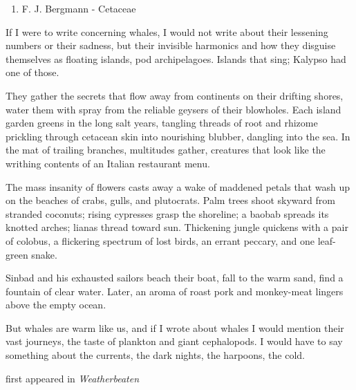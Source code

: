 \begin{enumerate}
\def\labelenumi{\arabic{enumi}.}
\tightlist
\item
  F. J. Bergmann - Cetaceae
\end{enumerate}

If I were to write concerning whales, I would not write about their
lessening numbers or their sadness, but their invisible harmonics and
how they disguise themselves as floating islands, pod archipelagoes.
Islands that sing; Kalypso had one of those.

They gather the secrets that flow away from continents on their drifting
shores, water them with spray from the reliable geysers of their
blowholes. Each island garden greens in the long salt years, tangling
threads of root and rhizome prickling through cetacean skin into
nourishing blubber, dangling into the sea. In the mat of trailing
branches, multitudes gather, creatures that look like the writhing
contents of an Italian restaurant menu.

The mass insanity of flowers casts away a wake of maddened petals that
wash up on the beaches of crabs, gulls, and plutocrats. Palm trees shoot
skyward from stranded coconuts; rising cypresses grasp the shoreline; a
baobab spreads its knotted arches; lianas thread toward sun. Thickening
jungle quickens with a pair of colobus, a flickering spectrum of lost
birds, an errant peccary, and one leaf-green snake.

Sinbad and his exhausted sailors beach their boat, fall to the warm
sand, find a fountain of clear water. Later, an aroma of roast pork and
monkey-meat lingers above the empty ocean.

But whales are warm like us, and if I wrote about whales I would mention
their vast journeys, the taste of plankton and giant cephalopods. I
would have to say something about the currents, the dark nights, the
harpoons, the cold.

first appeared in \emph{Weatherbeaten}
